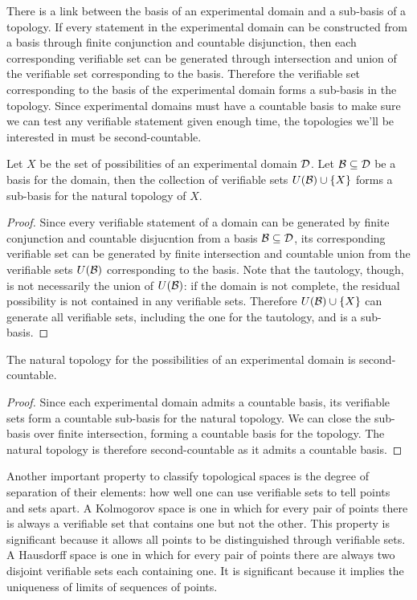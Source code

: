 \documentclass[11pt,letterpaper,fleqn]{memoir} %
\begin{document}
There is a link between the basis of an experimental domain and a sub-basis of a topology. If every statement in the experimental domain can be constructed from a basis through finite conjunction and countable disjunction, then each corresponding verifiable set can be generated through intersection and union of the verifiable set corresponding to the basis. Therefore the verifiable set corresponding to the basis of the experimental domain forms a sub-basis in the topology. Since experimental domains must have a countable basis to make sure we can test any verifiable statement given enough time, the topologies we'll be interested in must be second-countable.

\begin{mathSection}
	\begin{prop}
		Let $X$ be the set of possibilities of an experimental domain $\mathcal{D}$. Let $\mathcal{B} \subseteq \mathcal{D}$ be a basis for the domain, then the collection of verifiable sets $U(\mathcal{B})\cup\{X\}$ forms a sub-basis for the natural topology of $X$.
	\end{prop}
	\begin{proof}
		Since every verifiable statement of a domain can be generated by finite conjunction and countable disjucntion from a basis $\mathcal{B} \subseteq \mathcal{D}$, its corresponding verifiable set can be generated by finite intersection and countable union from the verifiable sets $U(\mathcal{B})$ corresponding to the basis. Note that the tautology, though, is not necessarily the union of $U(\mathcal{B})$: if the domain is not complete, the residual possibility is not contained in any verifiable sets. Therefore $U(\mathcal{B})\cup\{X\}$ can generate all verifiable sets, including the one for the tautology, and is a sub-basis.
	\end{proof}
	\begin{prop}
		The natural topology for the possibilities of an experimental domain is second-countable.
	\end{prop}
	\begin{proof}
		Since each experimental domain admits a countable basis, its verifiable sets form a countable sub-basis for the natural topology. We can close the sub-basis over finite intersection, forming a countable basis for the topology. The natural topology is therefore second-countable as it admits a countable basis.
\end{proof}
\end{mathSection}

Another important property to classify topological spaces is the degree of separation of their elements: how well one can use verifiable sets to tell points and sets apart. A Kolmogorov space is one in which for every pair of points there is always a verifiable set that contains one but not the other. This property is significant because it allows all points to be distinguished through verifiable sets. A Hausdorff space is one in which for every pair of points there are always two disjoint verifiable sets each containing one. It is significant because it implies the uniqueness of limits of sequences of points.
\end{document}
